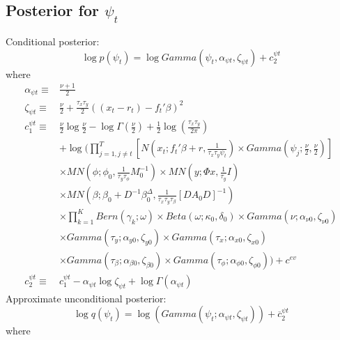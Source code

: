 \documentclass[11pt]{article}
\begin{document}
\subsection{Posterior for $\psi_t$}
Conditional posterior:
\begin{equation}
	\log p\left(\psi_{t}\right)=\log Gamma\left(\psi_{t},\alpha_{\psi t},\zeta_{\psi t}\right)+c_{2}^{\psi t}
\end{equation}
where
\begin{align*}
	\alpha_{\psi t}\equiv&\frac{\nu+1}{2}\\\zeta_{\psi t}\equiv&\frac{\nu}{2}+\frac{\tau_{x}\tau_{y}}{2}\left(\left(x_{t}-r_{t}\right)-f_{t}'\beta\right)^{2}\\c_{1}^{\psi t}\equiv&\frac{\nu}{2}\log\frac{\nu}{2}-\log\Gamma\left(\frac{\nu}{2}\right)+\frac{1}{2}\log\left(\frac{\tau_{x}\tau_{y}}{2\pi}\right)\\&+\log\Bigg(\prod_{j=1,j\ne t}^{T}\left[N\left(x_{t};f_{t}'\beta+r,\frac{1}{\tau_{x}\tau_{y}\psi_{t}}\right)\times Gamma\left(\psi_{j};\frac{\nu}{2},\frac{\nu}{2}\right)\right]\\&\times MN\left(\phi;\phi_{0},\frac{1}{\tau_{y}\tau_{\phi}}M_{0}^{-1}\right)\times MN\left(y;\Phi x,\frac{1}{\tau_{y}}I\right)\\&\times MN\left(\beta;\beta_{0}+D^{-1}\beta_{0}^{\Delta},\frac{1}{\tau_{x}\tau_{y}\tau_{\beta}}\left[DA_{0}D\right]^{-1}\right)\\&\times\prod_{k=1}^{K}Bern\left(\gamma_{k};\omega\right)\times Beta\left(\omega;\kappa_{0},\delta_{0}\right)\times Gamma\left(\nu;\alpha_{\nu0},\zeta_{\nu0}\right)\\&\times Gamma\left(\tau_{y};\alpha_{y0},\zeta_{y0}\right)\times Gamma\left(\tau_{x};\alpha_{x0},\zeta_{x0}\right)\\&\times Gamma\left(\tau_{\beta};\alpha_{\beta0},\zeta_{\beta0}\right)\times Gamma\left(\tau_{\phi};\alpha_{\phi0},\zeta_{\phi0}\right)\Bigg)+c^{ev}\\c_{2}^{\psi t}\equiv&c_{1}^{\psi t}-\alpha_{\psi t}\log\zeta_{\psi t}+\log\Gamma\left(\alpha_{\psi t}\right)
\end{align*}
Approximate unconditional posterior:
\begin{equation}
	\log q\left(\psi_{t}\right) = \log\left(Gamma\left(\psi_{t};\alpha_{\psi t},\zeta_{\psi t}\right)\right)+\overline{c}_{2}^{\psi t}
\end{equation}
where
\end{document}
